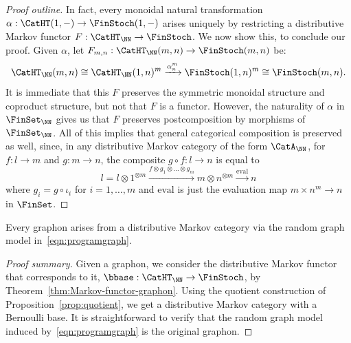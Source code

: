 \begin{proof}[Proof outline]
  In fact, every monoidal natural transformation $\alpha : \CatHT(1,-)
  \to \FinStoch(1,-)$ arises uniquely by restricting a distributive
  Markov functor $F : \CatHT_\NN \to \FinStoch$. We now show this, to
  conclude our proof. 
  Given $\alpha$, let $F_{m,n} : \CatHT_\NN(m,n) \to \FinStoch(m,n)$ be:%
  \begin{displaymath}
    \CatHT_\NN(m,n) \cong \CatHT_\NN(1,n)^m \xrightarrow{\alpha_n^m} \FinStoch(1,n)^m \cong \FinStoch(m,n).
  \end{displaymath}
  It is immediate that this $F$ preserves the symmetric monoidal structure and coproduct structure, but not that $F$ is a functor.
  However, the naturality of $\alpha$ in $\FinSet_\NN$ gives us that $F$ preserves postcomposition by morphisms of $\FinSet_\NN$.
  All of this implies that general categorical composition is preserved as well, since, in any distributive Markov category of the form $\CatA_\NN$, for $f : l \to m$ and $g : m \to n$, the composite $g \circ f : l \to n$ is equal to
  \begin{displaymath}
    l = l \otimes 1^{\otimes m}
    \xrightarrow{f \otimes g_1 \otimes \ldots \otimes g_m}
    m \otimes n^{\otimes m} \xrightarrow{\text{eval}} n
  \end{displaymath}
  where $g_i = g \circ \iota_i$ for $i = 1,\ldots,m$ and $\text{eval}$ is just the evaluation map $m \times n^m \to n$ in $\FinSet$.
\end{proof}

\begin{corollary}\label{corollary:graphon-markov}
  Every graphon arises from a distributive Markov category via the random graph model in~\eqref{eqn:programgraph}.
\end{corollary}
\begin{proof}[Proof summary]
  Given a graphon, we consider the distributive Markov functor that
  corresponds to it, $\bbase : \CatHT_\NN \to \FinStoch$, by Theorem~\ref{thm:Markov-functor-graphon}.
  Using the quotient construction of Proposition~\ref{prop:quotient}, we get a distributive Markov category with a Bernoulli base.
  It is straightforward to verify that the random graph model induced by~\eqref{eqn:programgraph} is the original graphon.
\end{proof}

